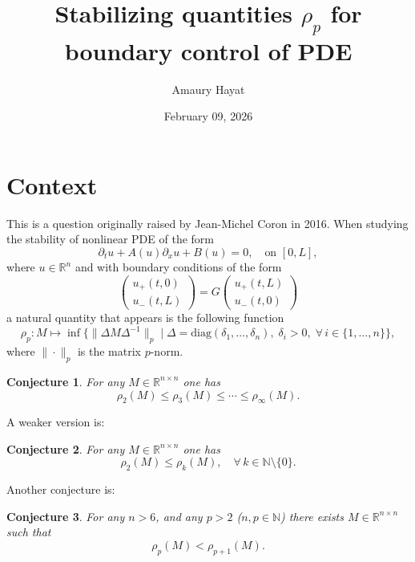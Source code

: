 \documentclass{article}
\title{Stabilizing quantities $\rho_p$ for boundary control of PDE}
\author{Amaury Hayat}
\date{February 09, 2026}
\newtheorem{conjecture}{Conjecture}
\begin{document}
\maketitle

\section*{Context}

This is a question originally raised by Jean-Michel Coron in 2016.
When studying the stability of nonlinear PDE of the form
\begin{equation}
\partial_t u + A(u)\partial_x u + B(u) = 0, \quad \text{on } [0, L],
\end{equation}
where $u \in \mathbb{R}^n$ and with boundary conditions of the form
\begin{equation}
\begin{pmatrix} u_+(t, 0) \\ u_-(t, L) \end{pmatrix}
= G \begin{pmatrix} u_+(t, L) \\ u_-(t, 0) \end{pmatrix}
\end{equation}
a natural quantity that appears is the following function
\begin{equation}
\rho_p : M \mapsto \inf\{\|\Delta M \Delta^{-1}\|_p \mid \Delta = \mathrm{diag}(\delta_1, \ldots, \delta_n),\; \delta_i > 0,\; \forall\, i \in \{1, \ldots, n\}\},
\end{equation}
where $\|\cdot\|_p$ is the matrix $p$-norm.

\begin{conjecture}
For any $M \in \mathbb{R}^{n \times n}$ one has
\begin{equation}
\rho_2(M) \leq \rho_3(M) \leq \cdots \leq \rho_\infty(M).
\end{equation}
\end{conjecture}

A weaker version is:
\begin{conjecture}
For any $M \in \mathbb{R}^{n \times n}$ one has
\begin{equation}
\rho_2(M) \leq \rho_k(M), \quad \forall\, k \in \mathbb{N} \setminus \{0\}.
\end{equation}
\end{conjecture}

Another conjecture is:
\begin{conjecture}
For any $n > 6$, and any $p > 2$ ($n, p \in \mathbb{N}$) there exists $M \in \mathbb{R}^{n \times n}$ such that
\begin{equation}
\rho_p(M) < \rho_{p+1}(M).
\end{equation}
\end{conjecture}
\end{document}
